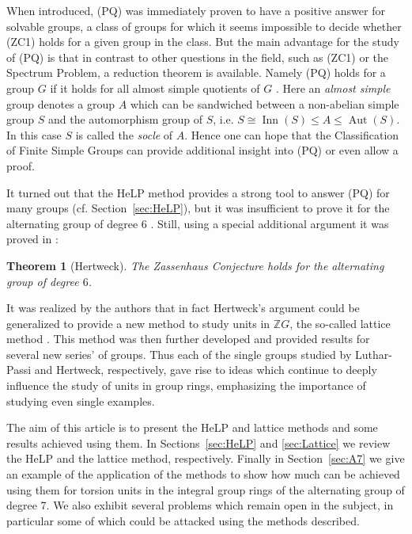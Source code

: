 \documentclass[10pt,a4paper,reqno]{amsart}
\newtheorem{theorem}{Theorem}[section]
\theoremstyle{definition}
\theoremstyle{remark}
\newcommand{\Aut}{\operatorname{Aut}}
\newcommand{\ZZ}{\mathbb{Z}}
\begin{document}
When introduced, (PQ) was immediately proven to have a positive answer for solvable groups, a class of groups for which it seems impossible to decide whether (ZC1) holds for a given group in the class. But the main advantage for the study of (PQ) is that in contrast to other questions in the field, such as (ZC1) or the Spectrum Problem, a reduction theorem is available. Namely (PQ) holds for a group $G$ if it holds for all almost simple 
quotients
of $G$ \cite{KK16}. Here an \emph{almost simple} group denotes a group $A$ which can be sandwiched between a non-abelian simple group $S$ and the automorphism group of $S$, i.e. $S \cong \operatorname{Inn}(S) \leqslant A \leqslant \Aut(S)$. In this case $S$ is called the \emph{socle} of $A$. Hence one can hope that the Classification of Finite Simple Groups can provide additional insight into (PQ) or even allow a proof.  

It turned out that the HeLP method provides a strong tool to answer (PQ) for many groups (cf. Section~\ref{sec:HeLP}), but it was insufficient to prove it for the alternating group of degree $6$ \cite{Sal07}. Still, using a special additional argument it was proved in \cite{HertweckA6}:

\begin{theorem}[Hertweck]\label{th:A6}
The Zassenhaus Conjecture holds for the alternating group of degree $6$.
\end{theorem} 

It was realized by the authors that in fact Hertweck's argument could be generalized to provide a new method to study units in $\ZZ G$, the so-called lattice method \cite{BM17}. This method was then further developed and provided results for several new series' of groups. Thus each of the single groups studied by Luthar-Passi and Hertweck, respectively, gave rise to ideas which continue to deeply influence the study of units in group rings, emphasizing the importance of studying even single examples.

The aim of this article is to present the HeLP and lattice methods and some results achieved using them. In Sections~\ref{sec:HeLP} and \ref{sec:Lattice} we review the HeLP and the lattice method, respectively. Finally in Section~\ref{sec:A7} we give an example of the application of the methods to show how much can be achieved using them for torsion units in the integral group rings of the alternating group of degree 7. We also exhibit several problems which remain open in the subject, in particular some of which could be attacked using the methods described.
\end{document}

